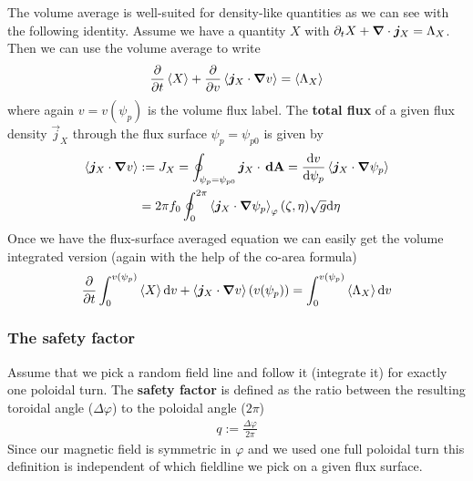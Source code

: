 The volume average is well-suited for density-like quantities
as we can see with the following identity.
Assume we have a quantity $X$ with $\partial_t X + {\boldsymbol{\nabla}}\cdot {\boldsymbol{j}}_X = \Lambda_X$.
Then we can use the volume average to write
\begin{align}
\frac{\partial}{\partial t} \left \langle X  \right \rangle + \frac{\partial}{
  \partial v} \left \langle  {\boldsymbol{j}}_X\cdot{\boldsymbol{\nabla}} v \right \rangle  = \left \langle  \Lambda_X \right \rangle
\label{eq:fsa_balance}
\end{align}
where again $v=v(\psi_p)$ is the volume flux label.
The {\bf total flux} of a given flux density $\vec j_X$ through the
flux surface $\psi_p = \psi_{p0}$ is given by
\begin{align}
\left \langle {\boldsymbol{j}}_X\cdot{\boldsymbol{\nabla}} v \right \rangle &:= J_X=\oint_{\psi_p=\psi_{p0}} {\boldsymbol{j}}_X\cdot {\boldsymbol{\,\mathrm{dA}}} =
 \frac{\mathrm{d} v}{\mathrm{d}\psi_p} \left \langle  {\boldsymbol{j}}_X\cdot{\boldsymbol{\nabla}}\psi_p  \right \rangle\nonumber\\
 &=
   2\pi f_0 \oint_0^{2\pi} \left \langle  {\boldsymbol{j}}_X\cdot{\boldsymbol{\nabla}}\psi_p \right\rangle_\varphi(\zeta,\eta) \sqrt{g}\mathrm{d}\eta
\label{eq:total_flux}
\end{align}
Once we have the flux-surface averaged equation we can easily get the volume integrated version (again with the help of the co-area formula)
\begin{align}
\frac{\partial}{\partial t} \int_0^{v(\psi_p)}\left \langle X \right \rangle \mathrm{d} v 
+ \left \langle  {\boldsymbol{j}}_X\cdot{\boldsymbol{\nabla}} v \right \rangle(v(\psi_p))  = \int_0^{v(\psi_p)}\left \langle  \Lambda_X \right \rangle\mathrm{d} v
\label{eq:integral_balance}
\end{align}

\subsubsection{The safety factor}
Assume that we pick a random field line and follow it (integrate it) for exactly one
poloidal turn. The {\bf safety factor} is defined as the ratio between
the resulting toroidal angle ($\Delta\varphi$) to the poloidal angle ($2\pi$)
\begin{align}
q := \frac{\Delta\varphi}{2\pi}
\label{}
\end{align}
Since our magnetic field is symmetric in $\varphi$ and we used one
full poloidal turn this definition is independent of which
fieldline we pick on a given flux surface.


